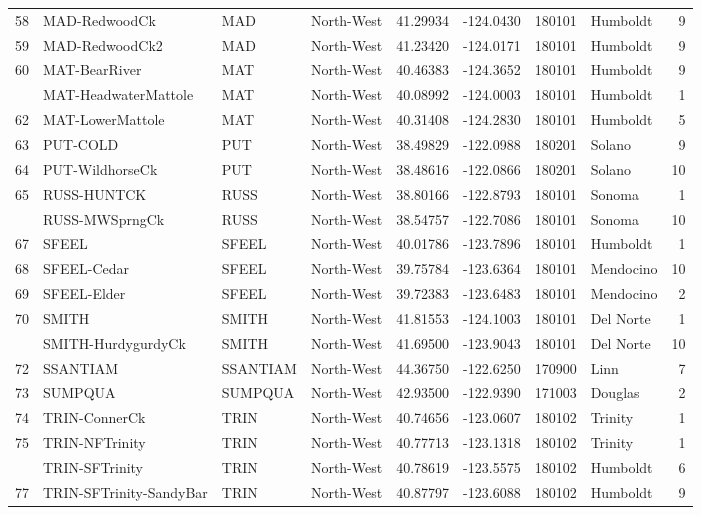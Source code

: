 \documentclass[proquest,12pt,final]{ucthesis-CA2012} %
\begin{document}
\begin{ucmainmatter}
\begin{longtable}[t]{r>{\raggedright\arraybackslash}p{9em}llrrr>{\raggedright\arraybackslash}p{5em}r}
58 & MAD-RedwoodCk & MAD & North-West & 41.29934 & -124.0430 & 180101 & Humboldt & 9\\
59 & MAD-RedwoodCk2 & MAD & North-West & 41.23420 & -124.0171 & 180101 & Humboldt & 9\\
60 & MAT-BearRiver & MAT & North-West & 40.46383 & -124.3652 & 180101 & Humboldt & 9\\
\addlinespace
61 & MAT-HeadwaterMattole & MAT & North-West & 40.08992 & -124.0003 & 180101 & Humboldt & 1\\
62 & MAT-LowerMattole & MAT & North-West & 40.31408 & -124.2830 & 180101 & Humboldt & 5\\
63 & PUT-COLD & PUT & North-West & 38.49829 & -122.0988 & 180201 & Solano & 9\\
64 & PUT-WildhorseCk & PUT & North-West & 38.48616 & -122.0866 & 180201 & Solano & 10\\
65 & RUSS-HUNTCK & RUSS & North-West & 38.80166 & -122.8793 & 180101 & Sonoma & 1\\
\addlinespace
66 & RUSS-MWSprngCk & RUSS & North-West & 38.54757 & -122.7086 & 180101 & Sonoma & 10\\
67 & SFEEL & SFEEL & North-West & 40.01786 & -123.7896 & 180101 & Humboldt & 1\\
68 & SFEEL-Cedar & SFEEL & North-West & 39.75784 & -123.6364 & 180101 & Mendocino & 10\\
69 & SFEEL-Elder & SFEEL & North-West & 39.72383 & -123.6483 & 180101 & Mendocino & 2\\
70 & SMITH & SMITH & North-West & 41.81553 & -124.1003 & 180101 & Del Norte & 1\\
\addlinespace
71 & SMITH-HurdygurdyCk & SMITH & North-West & 41.69500 & -123.9043 & 180101 & Del Norte & 10\\
72 & SSANTIAM & SSANTIAM & North-West & 44.36750 & -122.6250 & 170900 & Linn & 7\\
73 & SUMPQUA & SUMPQUA & North-West & 42.93500 & -122.9390 & 171003 & Douglas & 2\\
74 & TRIN-ConnerCk & TRIN & North-West & 40.74656 & -123.0607 & 180102 & Trinity & 1\\
75 & TRIN-NFTrinity & TRIN & North-West & 40.77713 & -123.1318 & 180102 & Trinity & 1\\
\addlinespace
76 & TRIN-SFTrinity & TRIN & North-West & 40.78619 & -123.5575 & 180102 & Humboldt & 6\\
77 & TRIN-SFTrinity-SandyBar & TRIN & North-West & 40.87797 & -123.6088 & 180102 & Humboldt & 9\\

\end{longtable}
\end{ucmainmatter}
\end{document}
